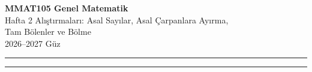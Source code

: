 \documentclass[11pt,a4paper]{article}
\newcounter{alis}
\begin{document}
\begin{minipage}[c]{\textwidth}
{\LARGE\bfseries\color{anamavi} MMAT105 Genel Matematik}\\[4pt]
{\large Hafta 2 Alıştırmaları: Asal Sayılar, Asal Çarpanlara Ayırma,\\ Tam Bölenler ve Bölme}\\[6pt]
{\small 2026--2027 Güz}
\end{minipage}

\vspace{4pt}\noindent\textcolor{anamavi}{\rule{\textwidth}{1pt}}



\vspace{6pt}
\noindent\textcolor{anamavi}{\rule{\textwidth}{0.5pt}}\\
{\small }
\end{document}
